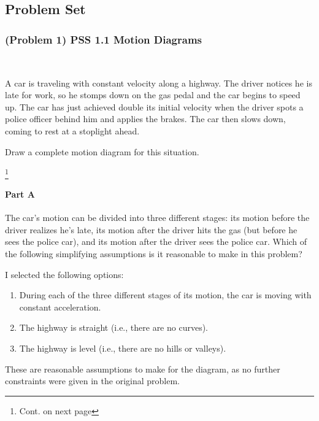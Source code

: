 
\subsection{Problem Set}

\subsubsection{(Problem 1) PSS 1.1 Motion Diagrams}
~
\begin{prb}

	A car is traveling with constant velocity along a highway. The driver notices he is late for work, so he stomps down on the gas pedal and the car begins to speed up. The car has just achieved double its initial velocity when the driver spots a police officer behind him and applies the brakes. The car then slows down, coming to rest at a stoplight ahead.

	Draw a complete motion diagram for this situation.

\end{prb}

\footnote{Cont. on next page}

\newpage

\paragraph{Part A}

The car's motion can be divided into three different stages: its motion before the driver realizes he's late, its  motion after the driver hits the gas (but before he sees the police car), and its motion after the driver sees the police car. Which of the following simplifying assumptions is it reasonable to make in this problem?

\vspace{1em}

\begin{solution}
	I selected the following options:

	\begin{enumerate}
		\item During each of the three different stages of its motion, the car is moving with constant acceleration.
		\item The highway is straight (i.e., there are no curves).
		\item The highway is level (i.e., there are no hills or valleys).
	\end{enumerate}

	These are reasonable assumptions to make for the diagram, as no further constraints were given in the original problem.

\end{solution}

